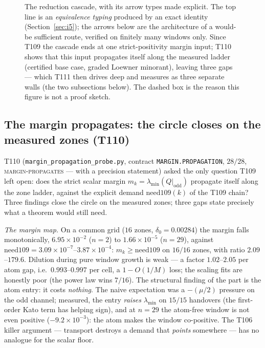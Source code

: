 \documentclass[11pt,a4paper]{article}
\begin{document}
\begin{figure}[htp]
\caption{The reduction cascade, with its arrow types made explicit. The top line is an
\emph{equivalence typing} produced by an exact identity (Section~\ref{sec:i5}); the arrows below are the
architecture of a would-be sufficient route, verified on finitely many windows only. Since T109 the
cascade ends at one strict-positivity margin input; T110 shows that this input propagates itself along
the measured ladder (certified base case, graded Loewner minorant), leaving three gaps --- which T111
then drives deep and measures as three separate walls (the two subsections below). The dashed box is
the reason this figure is not a
proof sketch.}\label{fig:cascade}
\end{figure}

\subsection{The margin propagates: the circle closes on the measured zones (T110)}
T110 (\texttt{margin\_propagation\_probe.py}, contract \texttt{MARGIN.PROPAGATION}, $28/28$,
\textsc{margin-propagates} --- with a precision statement) asked the only question T109 left open:
does the strict scalar margin $m_k=\lambda_{\min}(Q|_{\mathrm{odd}})$ propagate itself along the zone
ladder, against the explicit demand $\mathrm{need109}(k)$ of the T109 chain? Three findings close the
circle on the measured zones; three gaps state precisely what a theorem would still need.

\emph{The margin map.} On a common grid ($16$ zones, $\delta_0=0.00284$) the margin falls
monotonically, $6.95\times10^{-2}$ ($n=2$) to $1.66\times10^{-5}$ ($n=29$), against
$\mathrm{need109}=3.09\times10^{-7}$--$3.87\times10^{-4}$: $m_k\ge\mathrm{need109}$ on $16/16$ zones,
with ratio $2.09$--$179.6$. Dilution during pure window growth is weak --- a factor $1.02$--$2.05$ per
atom gap, i.e.\ $0.993$--$0.997$ per cell, a $1-O(1/M)$ loss; the scaling fits are honestly poor
(the power law wins $7/16$). The structural finding of the part is the atom entry: it costs
\emph{nothing}. The naive expectation was a $-(\mu/2)$ pressure on the odd channel; measured, the
entry \emph{raises} $\lambda_{\min}$ on $15/15$ handovers (the first-order Kato term has helping
sign), and at $n=29$ the atom-free window is not even positive ($-9.2\times10^{-3}$): the atom makes
the window co-positive. The T106 killer argument --- transport destroys a demand that \emph{points}
somewhere --- has no analogue for the scalar floor.
\end{document}
